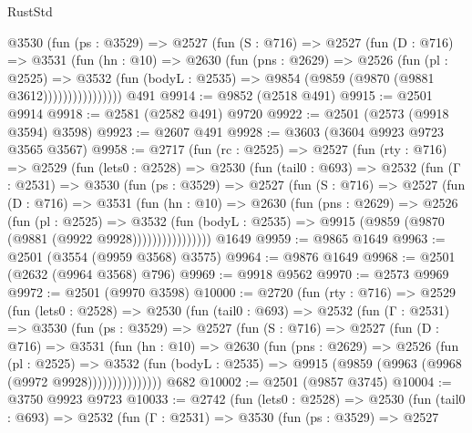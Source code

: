\begin{lexlean}{RustStd}
\begin{coremodule}
              @3530
                (fun (ps : @3529) =>
                @2527
                  (fun (S : @716) =>
                  @2527
                    (fun (D : @716) =>
                    @3531
                      (fun (hn : @10) =>
                      @2630
                        (fun (pns : @2629) =>
                        @2526
                          (fun (pl : @2525) =>
                          @3532
                            (fun (bodyL : @2535) => @9854 (@9859 (@9870 (@9881 @3612))))))))))))))))
    @491
@9914 := @9852 (@2518 @491)
@9915 := @2501 @9914
@9918 := @2581 (@2582 @491) @9720
@9922 := @2501 (@2573 (@9918 @3594) @3598)
@9923 := @2607 @491
@9928 := @3603 (@3604 @9923 @9723 @3565 @3567)
@9958 := @2717
    (fun (rc : @2525) =>
    @2527
      (fun (rty : @716) =>
      @2529
        (fun (lets0 : @2528) =>
        @2530
          (fun (tail0 : @693) =>
          @2532
            (fun (Γ : @2531) =>
            @3530
              (fun (ps : @3529) =>
              @2527
                (fun (S : @716) =>
                @2527
                  (fun (D : @716) =>
                  @3531
                    (fun (hn : @10) =>
                    @2630
                      (fun (pns : @2629) =>
                      @2526
                        (fun (pl : @2525) =>
                        @3532
                          (fun (bodyL : @2535) =>
                          @9915 (@9859 (@9870 (@9881 (@9922 @9928))))))))))))))))
    @1649
@9959 := @9865 @1649
@9963 := @2501 (@3554 (@9959 @3568) @3575)
@9964 := @9876 @1649
@9968 := @2501 (@2632 (@9964 @3568) @796)
@9969 := @9918 @9562
@9970 := @2573 @9969
@9972 := @2501 (@9970 @3598)
@10000 := @2720
    (fun (rty : @716) =>
    @2529
      (fun (lets0 : @2528) =>
      @2530
        (fun (tail0 : @693) =>
        @2532
          (fun (Γ : @2531) =>
          @3530
            (fun (ps : @3529) =>
            @2527
              (fun (S : @716) =>
              @2527
                (fun (D : @716) =>
                @3531
                  (fun (hn : @10) =>
                  @2630
                    (fun (pns : @2629) =>
                    @2526
                      (fun (pl : @2525) =>
                      @3532
                        (fun (bodyL : @2535) =>
                        @9915 (@9859 (@9963 (@9968 (@9972 @9928)))))))))))))))
    @682
@10002 := @2501 (@9857 @3745)
@10004 := @3750 @9923 @9723
@10033 := @2742
    (fun (lets0 : @2528) =>
    @2530
      (fun (tail0 : @693) =>
      @2532
        (fun (Γ : @2531) =>
        @3530
          (fun (ps : @3529) =>
          @2527

\end{coremodule}
\end{lexlean}
